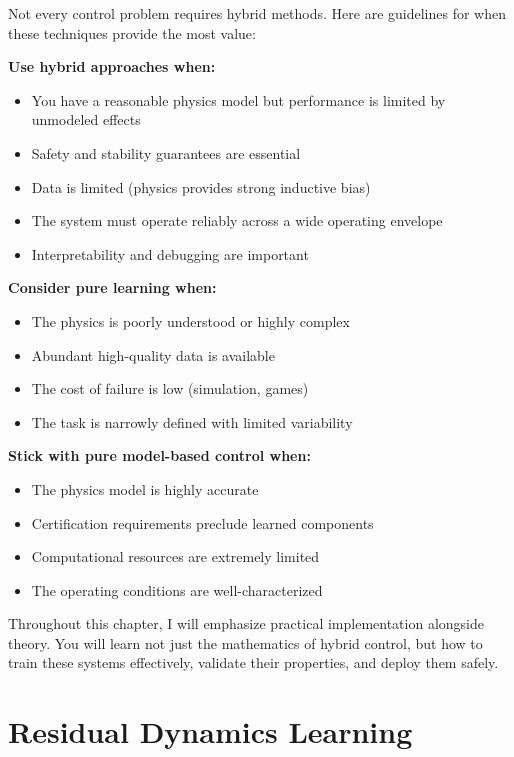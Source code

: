 Not every control problem requires hybrid methods. Here are guidelines for when these techniques provide the most value:

\textbf{Use hybrid approaches when:}
\begin{itemize}
    \item You have a reasonable physics model but performance is limited by unmodeled effects
    \item Safety and stability guarantees are essential
    \item Data is limited (physics provides strong inductive bias)
    \item The system must operate reliably across a wide operating envelope
    \item Interpretability and debugging are important
\end{itemize}

\textbf{Consider pure learning when:}
\begin{itemize}
    \item The physics is poorly understood or highly complex
    \item Abundant high-quality data is available
    \item The cost of failure is low (simulation, games)
    \item The task is narrowly defined with limited variability
\end{itemize}

\textbf{Stick with pure model-based control when:}
\begin{itemize}
    \item The physics model is highly accurate
    \item Certification requirements preclude learned components
    \item Computational resources are extremely limited
    \item The operating conditions are well-characterized
\end{itemize}

Throughout this chapter, I will emphasize practical implementation alongside theory. You will learn not just the mathematics of hybrid control, but how to train these systems effectively, validate their properties, and deploy them safely.

\section{Residual Dynamics Learning}
\label{sec:residual_dynamics}

